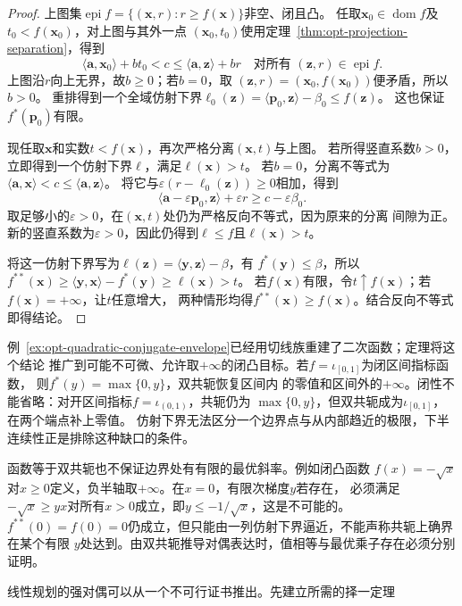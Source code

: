 \begin{proof}
上图集$\operatorname{epi}f=\{(\bm x,r):r\geq f(\bm x)\}$非空、闭且凸。
任取$\bm x_0\in\operatorname{dom}f$及$t_0<f(\bm x_0)$，对上图与其外一点
$(\bm x_0,t_0)$使用定理~\ref{thm:opt-projection-separation}，得到
\[
 \langle\bm a,\bm x_0\rangle+b t_0<c
 \leq\langle\bm a,\bm z\rangle+b r
 \quad\text{对所有 }(\bm z,r)\in\operatorname{epi}f.
\]
上图沿$r$向上无界，故$b\geq0$；若$b=0$，取
$(\bm z,r)=(\bm x_0,f(\bm x_0))$便矛盾，所以$b>0$。
重排得到一个全域仿射下界$\ell_0(\bm z)=\langle\bm p_0,\bm z\rangle-\beta_0\leq f(\bm z)$。
这也保证$f^*(\bm p_0)$有限。

现任取$\bm x$和实数$t<f(\bm x)$，再次严格分离$(\bm x,t)$与上图。
若所得竖直系数$b>0$，立即得到一个仿射下界$\ell$，满足$\ell(\bm x)>t$。
若$b=0$，分离不等式为$\langle\bm a,\bm x\rangle<c\leq\langle\bm a,\bm z\rangle$。
将它与$\varepsilon(r-\ell_0(\bm z))\geq0$相加，得到
\[
 \langle\bm a-\varepsilon\bm p_0,\bm z\rangle+\varepsilon r
 \geq c-\varepsilon\beta_0.
\]
取足够小的$\varepsilon>0$，在$(\bm x,t)$处仍为严格反向不等式，因为原来的分离
间隙为正。新的竖直系数为$\varepsilon>0$，因此仍得到$\ell\leq f$且$\ell(\bm x)>t$。

将这一仿射下界写为$\ell(\bm z)=\langle\bm y,\bm z\rangle-\beta$，有
$f^*(\bm y)\leq\beta$，所以
$f^{**}(\bm x)\geq\langle\bm y,\bm x\rangle-f^*(\bm y)
\geq\ell(\bm x)>t$。
若$f(\bm x)$有限，令$t\uparrow f(\bm x)$；若$f(\bm x)=+\infty$，让$t$任意增大，
两种情形均得$f^{**}(\bm x)\geq f(\bm x)$。结合反向不等式即得结论。
\end{proof}

例~\ref{ex:opt-quadratic-conjugate-envelope}已经用切线族重建了二次函数；定理将这个结论
推广到可能不可微、允许取$+\infty$的闭凸目标。若$f=\iota_{[0,1]}$为闭区间指标函数，
则$f^*(y)=\max\{0,y\}$，双共轭恢复区间内
的零值和区间外的$+\infty$。闭性不能省略：对开区间指标$f=\iota_{(0,1)}$，共轭仍为
$\max\{0,y\}$，但双共轭成为$\iota_{[0,1]}$，在两个端点补上零值。
仿射下界无法区分一个边界点与从内部趋近的极限，下半连续性正是排除这种缺口的条件。

函数等于双共轭也不保证边界处有有限的最优斜率。例如闭凸函数
$f(x)=-\sqrt{x}$对$x\geq0$定义，负半轴取$+\infty$。在$x=0$，有限次梯度$y$若存在，
必须满足$-\sqrt{x}\geq yx$对所有$x>0$成立，即$y\leq-1/\sqrt{x}$，这是不可能的。
$f^{**}(0)=f(0)=0$仍成立，但只能由一列仿射下界逼近，不能声称共轭上确界在某个有限
$y$处达到。由双共轭推导对偶表达时，值相等与最优乘子存在必须分别证明。

线性规划的强对偶可以从一个不可行证书推出。先建立所需的择一定理

